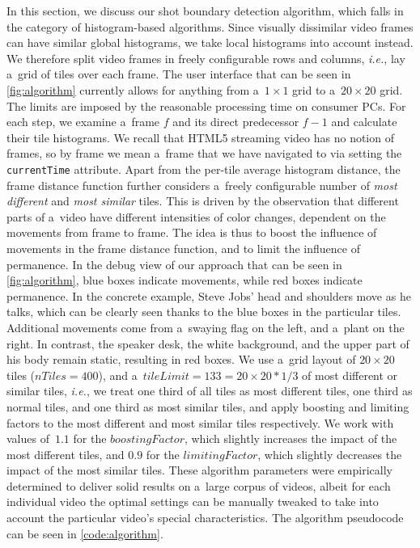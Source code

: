 In this section, we discuss our shot boundary detection algorithm,
which falls in the category of histogram-based algorithms.
Since visually dissimilar video frames
can have similar global histograms,
we take local histograms into account instead. 
We therefore split video frames in freely configurable
rows and columns, \emph{i.e.}, lay a~grid of tiles over each frame.
The user interface that can be seen in \autoref{fig:algorithm}
currently allows for anything from a~$\mathit{1} \times \mathit{1}$ 
grid to a~$\mathit{20} \times \mathit{20}$ grid.
The limits are imposed by the reasonable processing time on consumer PCs.
For each step, we examine a~frame $\mathit{f}$ and its direct
predecessor $\mathit{f - 1}$ and calculate their tile histograms.
We recall that HTML5 streaming video has no notion of frames,
so by frame we mean a~frame that we have navigated to
via setting the \texttt{currentTime} attribute.
Apart from the per-tile average histogram distance,
the frame distance function further considers
a~freely configurable number of \emph{most different} and
\emph{most similar} tiles.
This is driven by the observation that different parts
of a~video have different intensities of color changes,
dependent on the movements from frame to frame.
The idea is thus to boost the influence of movements in the frame
distance function, and to limit the influence of permanence.
In the debug view of our approach that can be seen in
\autoref{fig:algorithm}, blue boxes indicate movements,
while red boxes indicate permanence.
In the concrete example, Steve Jobs' head and shoulders move
as he talks, which can be clearly seen
thanks to the blue boxes in the particular tiles.
Additional movements come from a~swaying flag on the left,
and a~plant on the right.
In contrast, the speaker desk, the white background,
and the upper part of his body remain static,
resulting in red boxes.
We use a~grid layout of $\mathit{20} \times \mathit{20}$ tiles
($\mathit{nTiles} = \mathit{400}$), and
a~$\mathit{tileLimit = 133 = \mathit{20} \times \mathit{20} * 1/3}$
of most different or similar tiles,
\emph{i.e.}, we treat one third of all tiles
as most different tiles, one third as normal tiles,
and one third as most similar tiles,
and apply boosting and limiting factors to the most different
and most similar tiles respectively.
We work with values of~$\mathit{1.1}$ for the
$\mathit{boostingFactor}$, which slightly increases
the impact of the most different tiles,
and $\mathit{0.9}$ for the $\mathit{limitingFactor}$,
which slightly decreases the impact of the most similar tiles.
These algorithm parameters were empirically determined
to deliver solid results on a~large corpus of videos,
albeit for each individual video the optimal settings
can be manually tweaked to take into account the
particular video's special characteristics.
The algorithm pseudocode can be seen in \autoref{code:algorithm}.

